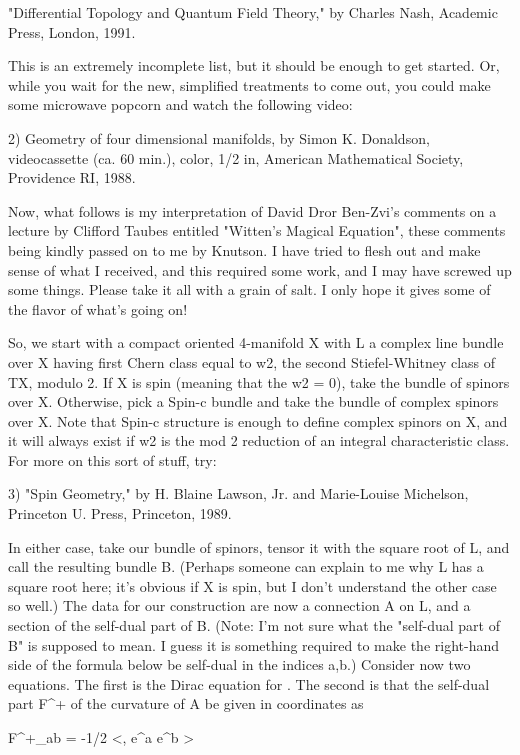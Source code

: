"Differential Topology and Quantum Field Theory," by Charles Nash,
Academic Press, London, 1991.


This is an extremely incomplete list, but it should be enough to get
started.  Or, while you wait for the new, simplified treatments to come
out, you could make some microwave popcorn and watch the following video:


2) Geometry of four dimensional manifolds, by Simon K. Donaldson,
videocassette (ca. 60 min.), color, 1/2 in, American Mathematical
Society, Providence RI, 1988.


Now, what follows is my interpretation of David Dror Ben-Zvi's comments
on a lecture by Clifford Taubes entitled "Witten's Magical Equation",
these comments being kindly passed on to me by Knutson.  I have tried to
flesh out and make sense of what I received, and this required some 
work, and I may have screwed up some things.  Please take it all with
a grain of salt.  I only hope it gives some of the flavor of what's
going on!

So, we start with a compact oriented 4-manifold X with L a complex line
bundle over X having first Chern class equal to w2, the second
Stiefel-Whitney class of TX, modulo 2.  If X is spin (meaning that the
w2 = 0), take the bundle of spinors over X.  Otherwise, pick a Spin-c
bundle and take the bundle of complex spinors over X.  Note that Spin-c
structure is enough to define complex spinors on X, and it will always
exist if w2 is the mod 2 reduction of an integral characteristic class.
For more on this sort of stuff, try:

3) "Spin Geometry," by H. Blaine Lawson, Jr. and Marie-Louise Michelson,
Princeton U. Press, Princeton, 1989.

In either case, take our bundle of spinors, tensor it with the square
root of L, and call the resulting bundle B.  (Perhaps someone can
explain to me why L has a square root here; it's obvious if X is spin,
but I don't understand the other case so well.)   The data for our
construction are now a connection A on L, and a section \Psi  of the
self-dual part of B.  (Note: I'm not sure what the "self-dual part of B"
is supposed to mean.  I guess it is something required to make the
right-hand side of the formula below be self-dual in the indices a,b.)
Consider now two equations.  The first is the Dirac equation for \Psi .
The second is that the self-dual part F^+ of the curvature of A be given
in coordinates as

F^+_{ab} = -1/2 <\Psi , e^a e^b \Psi >


